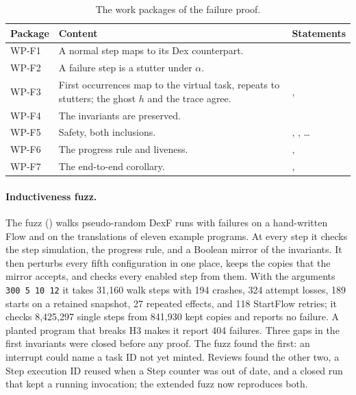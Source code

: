 \begin{table}[t]
\centering
\small
\begin{tabularx}{\textwidth}{@{}P{1.2cm}LP{5.2cm}@{}}
\toprule
Package & Content & Statements \\
\midrule
WP-F1 & A normal step maps to its Dex counterpart. &
   \\
WP-F2 & A failure step is a stutter under $\alpha$. &
   \\
WP-F3 & First occurrences map to the virtual task, repeats to stutters;
  the ghost $h$ and the trace agree. & ,
   \\
WP-F4 & The invariants are preserved. &  \\
WP-F5 & Safety, both inclusions. & ,
  , \ldots \\
WP-F6 & The progress rule and liveness. &
  ,  \\
WP-F7 & The end-to-end corollary. & ,
   \\
\bottomrule
\end{tabularx}
\caption{The work packages of the failure proof.}
\label{tab:failure-packages}
\end{table}

\paragraph{Inductiveness fuzz.}
The fuzz () walks pseudo-random DexF runs with failures
on a hand-written Flow and on the translations of eleven example \Lang{}
programs. At every step it checks the step simulation, the progress rule,
and a Boolean mirror of the invariants. It then perturbs every fifth
configuration in one place, keeps the copies that the mirror accepts, and
checks every enabled step from them. With the arguments
\texttt{300 5 10 12} it takes 31,160 walk steps with 194 crashes, 324
attempt losses, 189 starts on a retained snapshot, 27 repeated effects, and
118 StartFlow retries; it checks 8,425,297 single steps from 841,930 kept
copies and reports no failure. A planted program that breaks H3 makes it
report 404 failures. Three gaps in the first invariants were closed before
any proof. The fuzz found the first: an interrupt could name a task ID not
yet minted. Reviews found the other two, a Step execution ID reused when a
Step counter was out of date, and a closed run that kept a running
invocation; the extended fuzz now reproduces both.

